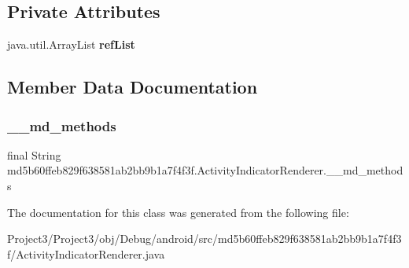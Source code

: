 \subsection*{Private Attributes}
\begin{DoxyCompactItemize}
\item 
\mbox{\label{classmd5b60ffeb829f638581ab2bb9b1a7f4f3f_1_1ActivityIndicatorRenderer_ad465ebc26140c383de6a0a2f34b1deb4}} 
java.\+util.\+Array\+List {\bfseries ref\+List}
\end{DoxyCompactItemize}


\subsection{Member Data Documentation}
\mbox{\label{classmd5b60ffeb829f638581ab2bb9b1a7f4f3f_1_1ActivityIndicatorRenderer_ab234fd2d3a2a9112481b6ec6f5f98c1d}} 
\subsubsection{\texorpdfstring{\+\_\+\+\_\+md\+\_\+methods}{\_\_md\_methods}}
{\footnotesize\ttfamily final String md5b60ffeb829f638581ab2bb9b1a7f4f3f.\+Activity\+Indicator\+Renderer.\+\_\+\+\_\+md\+\_\+methods\hspace{0.3cm}{\ttfamily [static]}}



The documentation for this class was generated from the following file\+:\begin{DoxyCompactItemize}
\item 
Project3/\+Project3/obj/\+Debug/android/src/md5b60ffeb829f638581ab2bb9b1a7f4f3f/Activity\+Indicator\+Renderer.\+java\end{DoxyCompactItemize}
